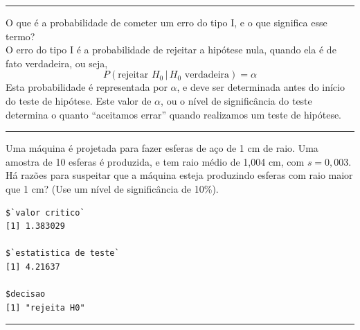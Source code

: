 \documentclass[a4paper,11pt,fleqn]{article}\usepackage[]{graphicx}\usepackage[]{color}
\makeatletter
\newenvironment{kframe}{%
 \def\at@end@of@kframe{}%
 \ifinner\ifhmode%
  \def\at@end@of@kframe{\end{minipage}}%
  \begin{minipage}{\columnwidth}%
 \fi\fi%
 \def\FrameCommand##1{\hskip\@totalleftmargin \hskip-\fboxsep
 \colorbox{shadecolor}{##1}\hskip-\fboxsep
     \hskip-\linewidth \hskip-\@totalleftmargin \hskip\columnwidth}%
 \MakeFramed {\advance\hsize-\width
   \@totalleftmargin\z@ \linewidth\hsize
   \@setminipage}}%
 {\par\unskip\endMakeFramed%
 \at@end@of@kframe}
\newenvironment{knitrout}{}{} %
\theoremstyle{definition}
\makeatother
\begin{document}

\vspace{0.3cm}
\hrule
\vspace{0.3cm}

\begin{compactenum}[13.]
\item O que é a probabilidade de cometer um erro do tipo I, e o que
  significa esse termo? \\
  O erro do tipo I é a probabilidade de rejeitar a hipótese nula,
  quando ela é de fato verdadeira, ou seja,
  \begin{equation*}
    P(\text{rejeitar } H_0 \, | \, H_0 \text{ verdadeira}) = \alpha
  \end{equation*}
  Esta probabilidade é representada por
  $\alpha$, e deve ser determinada antes do início do teste de
  hipótese. Este valor de $\alpha$, ou o nível de significância do teste
  determina o quanto ``aceitamos errar'' quando realizamos um teste de
  hipótese.
\end{compactenum}

\vspace{0.3cm}
\hrule
\vspace{0.3cm}

\begin{compactenum}[14.]
\item Uma máquina é projetada para fazer esferas de aço de 1 cm de
  raio. Uma amostra de 10 esferas é produzida, e tem raio médio de 1,004
  cm, com $s = 0,003$. Há razões para suspeitar que a máquina esteja
  produzindo esferas com raio maior que 1 cm? (Use um nível de
  significância de 10\%).
\begin{knitrout}\small
{}\color{fgcolor}\begin{kframe}
\begin{verbatim}
$`valor critico`
[1] 1.383029

$`estatistica de teste`
[1] 4.21637

$decisao
[1] "rejeita H0"
\end{verbatim}
\end{kframe}
\end{knitrout}
\end{compactenum}

\vspace{0.3cm}
\hrule
\vspace{0.3cm}
\end{document}
